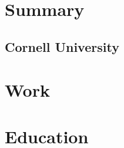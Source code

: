 \documentclass[a4paper,landscape]{deedy-resume} %
\begin{document}
\begin{minipage}[t]{0.33\textwidth} %


\section{Summary} 

\subsection{Cornell University}


\sectionspace %


\end{minipage} %
\hfill
%
%
\begin{minipage}[t]{0.66\textwidth} %


\section{Work}




\section{Education}


\sectionspace %

\end{minipage} %

\fi


%
%
\end{document}
